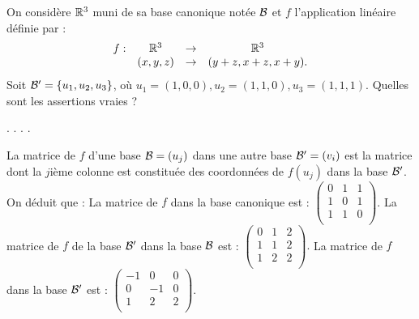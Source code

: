 \begin{question}
On considère $\mathbb{R}^3$ muni de sa base canonique notée ${\cal {B}}$ et 
$f$ l'application linéaire définie  par : 
$$\begin{array}{rccc}f:&\mathbb{R}^3 &\to& \mathbb{R}^3\\
& (x,y,z)&\to &(y+z,x+z,x+y).  \end{array}$$
Soit ${\cal {B'}} = \{u_1,u_2,u_3\}$, où
$ u_1=(1,0,0), u_2=(1,1,0), u_3=(1,1,1)$. Quelles sont les assertions vraies ?
\begin{answers} 
.
.
.
.
\end{answers}
\begin{explanations} La matrice de $f$  d'une base $ {\cal {B}}=(u_j)$ dans une autre base $ {\cal {B}}'=(v_i)$ est la matrice  dont la $j$ième colonne est constituée des coordonnées de  $f(u_j)$ dans la base $ {\cal {B}}'$. On déduit que :
\vskip0mm
La matrice de $f$ dans la base canonique est : $
\left(\begin{array}{rcc}
0&1&1\\
1&0&1\\ 
1&1&0\\
\end{array}\right)$.
\vskip0mm
La matrice de $f$ de la base $ {\cal {B'}}$ dans la base $ {\cal {B}}$ est : $
\left(\begin{array}{rcc}
0&1&2\\
1&1&2\\ 
1&2&2\\
\end{array}\right).$
\vskip0mm
La matrice de $f$ dans la base $ {\cal {B'}}$ est : $
\left(\begin{array}{rcc}
-1&0&0\\
0&-1&0\\ 
1&2&2\\
\end{array}\right)$.
\end{explanations}
\end{question}

